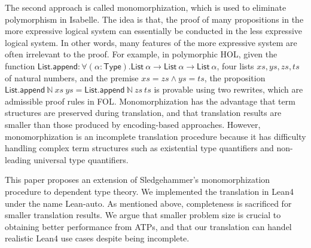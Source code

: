   \noindent The second approach is called monomorphization, which is used to eliminate polymorphism
  in Isabelle. The idea is that, the proof of many propositions in the more expressive logical
  system can essentially be conducted in the less expressive logical system. In other words,
  many features of the more expressive system are often irrelevant to the proof. For example,
  in polymorphic HOL, given the function
  $\mathsf{List.append} : \forall (\alpha : \mathsf{Type}). \mathsf{List} \ \alpha \to \mathsf{List} \ \alpha \to \mathsf{List} \ \alpha$,
  four lists $xs, ys, zs, ts$ of natural numbers, and the premise $xs = zs \land ys = ts$, the proposition
  $\mathsf{List.append} \ \mathbb{N} \ xs \ ys = \mathsf{List.append} \ \mathbb{N} \ zs \ ts$ is
  provable using two rewrites, which are admissible proof rules in FOL. Monomorphization
  has the advantage that term structures are preserved during translation, and that
  translation results are smaller than those produced by encoding-based approaches.
  However, monomorphization is an incomplete translation procedure because it has difficulty
  handling complex term structures such as existential
  type quantifiers and non-leading universal type quantifiers.

  \noindent This paper proposes an extension of Sledgehammer's monomorphization procedure
  to dependent type theory. We implemented the translation in Lean4 under the name Lean-auto.
  As mentioned above, completeness is sacrificed for smaller translation
  results. We argue that smaller problem size is crucial to obtaining better performance
  from ATPs, and that our translation can handel realistic Lean4 use cases despite being incomplete.